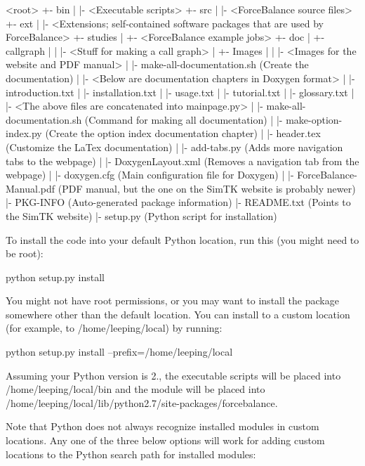 \begin{DoxyVerb}
<root>
  +- bin
  |   |- <Executable scripts>
  +- src
  |   |- <ForceBalance source files>
  +- ext
  |   |- <Extensions; self-contained software packages that are used by ForceBalance>
  +- studies
  |   +- <ForceBalance example jobs>
  +- doc
  |   +- callgraph
  |   |   |- <Stuff for making a call graph>
  |   +- Images
  |   |   |- <Images for the website and PDF manual>
  |   |- make-all-documentation.sh (Create the documentation)
  |   |- <Below are documentation chapters in Doxygen format>
  |   |- introduction.txt
  |   |- installation.txt
  |   |- usage.txt
  |   |- tutorial.txt
  |   |- glossary.txt
  |   |- <The above files are concatenated into mainpage.py>
  |   |- make-all-documentation.sh (Command for making all documentation)
  |   |- make-option-index.py (Create the option index documentation chapter)
  |   |- header.tex (Customize the LaTex documentation)
  |   |- add-tabs.py (Adds more navigation tabs to the webpage)
  |   |- DoxygenLayout.xml (Removes a navigation tab from the webpage)
  |   |- doxygen.cfg (Main configuration file for Doxygen)
  |   |- ForceBalance-Manual.pdf (PDF manual, but the one on the SimTK website is probably newer)
  |- PKG-INFO (Auto-generated package information)
  |- README.txt (Points to the SimTK website)
  |- setup.py (Python script for installation) \end{DoxyVerb}


\-To install the code into your default \-Python location, run this (you might need to be root)\-:

\begin{DoxyVerb}python setup.py install \end{DoxyVerb}


\-You might not have root permissions, or you may want to install the package somewhere other than the default location. \-You can install to a custom location (for example, to /home/leeping/local) by running\-:

\begin{DoxyVerb}python setup.py install --prefix=/home/leeping/local \end{DoxyVerb}


\-Assuming your \-Python version is 2., the executable scripts will be placed into {\ttfamily /home/leeping/local/bin} and the module will be placed into {\ttfamily /home/leeping/local/lib/python2.7/site-\/packages/forcebalance}.

\-Note that \-Python does not always recognize installed modules in custom locations. \-Any one of the three below options will work for adding custom locations to the \-Python search path for installed modules\-:


